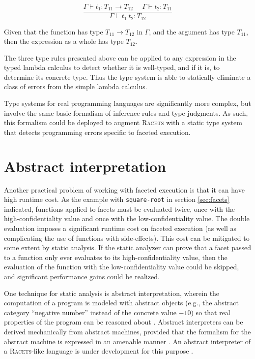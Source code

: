 \documentclass{article}
\begin{document}
\[
\frac{\Gamma \vdash t_1 : T_{11} \to T_{12}\ \ \ \ \ \ \Gamma \vdash t_2 : T_{11}}
{\Gamma \vdash t_1\ t_2 : T_{12}}
\]

Given that the function has type $T_{11} \to T_{12}$ in $\Gamma$, and the argument has type $T_{11}$, then the expression as a whole has type $T_{12}$.

The three type rules presented above can be applied to any expression in the typed lambda calculus to detect whether it is well-typed, and if it is, to determine its concrete type. Thus the type system is able to statically eliminate a class of errors from the simple lambda calculus.

Type systems for real programming languages are significantly more complex, but involve the same basic formalism of inference rules and type judgments. As such, this formalism could be deployed to augment \textsc{Racets} with a static type system that detects programming errors specific to faceted execution.



\section{Abstract interpretation}
Another practical problem of working with faceted execution is that it can have high runtime cost. As the example with \texttt{square-root} in section \ref{sec:facets} indicated, functions applied to facets must be evaluated twice, once with the high-confidentiality value and once with the low-confidentiality value. The double evaluation imposes a significant runtime cost on faceted execution (as well as complicating the use of functions with side-effects). This cost can be mitigated to some extent by static analysis. If the static analyzer can prove that a facet passed to a function only ever evaluates to its high-confidentiality value, then the evaluation of the function with the low-confidentiality value could be skipped, and significant performance gains could be realized.

One technique for static analysis is abstract interpretation, wherein the computation of a program is modeled with abstract objects (e.g., the abstract category ``negative number'' instead of the concrete value $-10$) so that real properties of the program can be reasoned about \cite{ai-original}. Abstract interpreters can be derived mechanically from abstract machines, provided that the formalism for the abstract machine is expressed in an amenable manner \cite{aam}. An abstract interpreter of a \textsc{Racets}-like language is under development for this purpose \cite{abstract-inter}.
\end{document}
